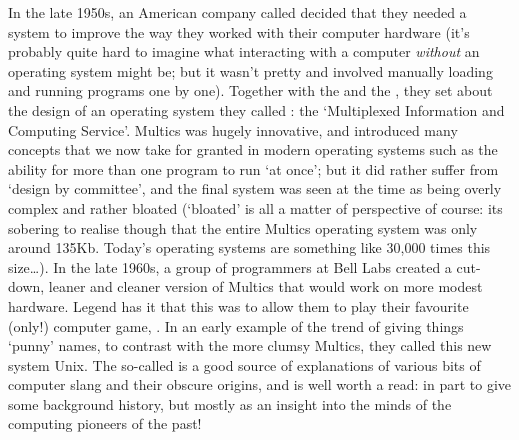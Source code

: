 In the late 1950s, an American company
called  decided that they
needed a system to improve the way they worked with their computer
hardware (it's probably quite hard to imagine what interacting with a
computer \emph{without} an operating system might be; but it wasn't
pretty and involved manually loading and running programs one by
one). Together with the  and the , they set about the design of an operating system they
called : the `Multiplexed Information and
Computing Service'. Multics was hugely innovative, and introduced many
concepts that we now take for granted in modern operating systems such
as the ability for more than one program to run `at once'; but it did
rather suffer from `design by committee', and the final system was
seen at the time as being overly complex and rather bloated (`bloated'
is all a matter of perspective of course: its sobering to realise
though that the entire Multics operating system was only around
135Kb. Today's operating systems are something like 30,000 times this
size\ldots). In the late 1960s, a group of programmers at Bell Labs
created a cut-down, leaner and cleaner version of Multics that would
work on more modest hardware. Legend has it that this was to allow
them to play their favourite (only!) computer
game, . In an early
example of the trend of giving things `punny' names, to contrast with
the more clumsy Multics, they called this new system Unix. The
so-called  is a good source of
explanations of various bits of computer slang and their obscure
origins, and is well worth a read: in part to give some background
history, but mostly as an insight into the minds of the computing
pioneers of the past!



